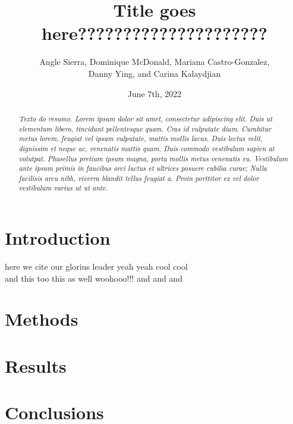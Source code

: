 \documentclass[11pt]{article}
\title {Title goes here?????????????????????\\[1ex]}
\author{
Angle Sierra, 
Dominique McDonald,
Mariana Castro-Gonzalez, \\
Danny Ying,
and Carina Kalaydjian \\[1ex]
}
\date{June 7th, 2022}
\newcommand{\abstractinenglishname}{Abstract}
\newenvironment{abstractinenglish}{
        \def\abstractname{\abstractinenglishname}
	\begin{abstract}
}{
        \end{abstract}
}
\begin{document}
\maketitle
\vspace{6pt}

\begin{abstractinenglish}
\emph{Texto do resumo. Lorem ipsum dolor sit amet, consectetur adipiscing elit. Duis ut elementum libero, tincidunt pellentesque quam. Cras id vulputate diam. Curabitur metus lorem, feugiat vel ipsum vulputate, mattis mollis lacus. Duis lectus velit, dignissim et neque ac, venenatis mattis quam. Duis commodo vestibulum sapien at volutpat. Phasellus pretium ipsum magna, porta mollis metus venenatis eu. Vestibulum ante ipsum primis in faucibus orci luctus et ultrices posuere cubilia curae; Nulla facilisis arcu nibh, viverra blandit tellus feugiat a. Proin porttitor ex vel dolor vestibulum varius ut ut ante.}
\end{abstractinenglish}

\section{Introduction}
here we cite \cite{web1} our glorius leader \cite{web2} yeah yeah cool cool \cite{briney2015data} \\

and this too \cite{monkey} this as well 
\cite{sonnetsData} woohooo!!! 
\cite{musicData} and 
\cite{syuzhet} and 
\cite{tm} and \cite{shakeFacts}

\section{Methods}

\section{Results}

\section{Conclusions}



\newpage{}



 
\end{document}
